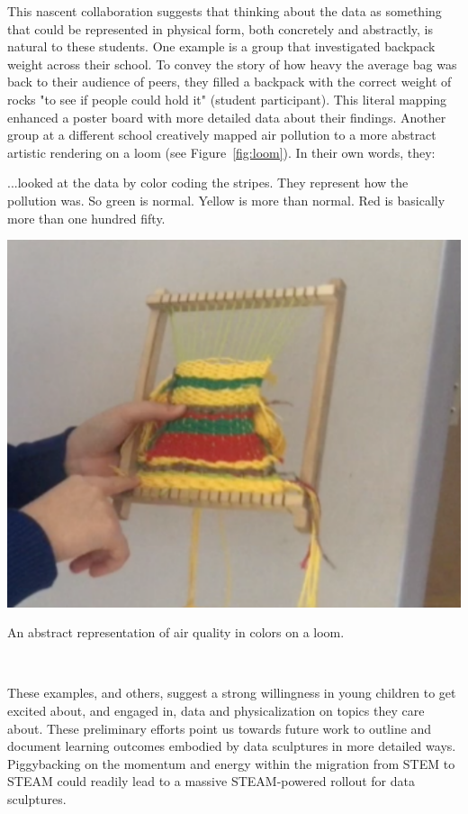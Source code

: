 \documentclass{sigchi-ext}
\begin{document}
This nascent collaboration suggests that thinking about the data as something that could be represented in physical form, both concretely and abstractly, is natural to these students.  One example is a group that investigated backpack weight across their school.  To convey the story of how heavy the average bag was back to their audience of peers, they filled a backpack with the correct weight of rocks "to see if people could hold it" (student participant). This literal mapping enhanced a poster board with more detailed data about their findings.  Another group at a different school creatively mapped air pollution to a more abstract artistic rendering on a loom (see Figure~\ref{fig:loom}).  In their own words, they:
\begin{displayquote}
...looked at the data by color coding the stripes.  They represent how the pollution was. So green is normal.  Yellow is more than normal.  Red is basically more than one hundred fifty.
\end{displayquote}

\begin{marginfigure}[-8pc]
  \begin{minipage}{\marginparwidth}
    \centering
    \includegraphics[width=1.0\marginparwidth]{figures/loom}
    \caption{An abstract representation of air quality in colors on a loom.}~\label{fig:loom}
  \end{minipage}
\end{marginfigure}

These examples, and others, suggest a strong willingness in young children to get excited about, and engaged in, data and physicalization on topics they care about.  These preliminary efforts point us towards future work to outline and document learning outcomes embodied by data sculptures in more detailed ways.  Piggybacking on the momentum and energy within the migration from STEM to STEAM could readily lead to a massive STEAM-powered rollout for data sculptures.
\end{document}
